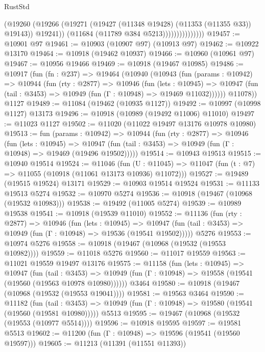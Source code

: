 \begin{lexlean}{RustStd}
\begin{coremodule}
{{{{{{{{{{{{{{{{{{{                              (@19260
                                (@19266
                                  (@19271 (@19427 (@11348 @19428) (@11353 (@11355 @33)) @19143))
                                  @19241))
                              (@11684 (@11789 @384 @5213)))))))))))))))
@19457 := @10901 @97
@19461 := @10903 (@10907 @97) (@10913 @97)
@19462 := @10922 @13170
@19464 := @10918 (@19462 @10937)
@19466 := @10960 (@10961 @97)
@19467 := @10956 @19466
@19469 := @10918 (@19467 @10985)
@19486 := @10917
    (fun (fn : @237) =>
    @19464
      (@10940
        (@10943
          (fun (params : @10942) =>
          @10944
            (fun (rty : @2877) =>
            @10946
              (fun (lets : @10945) =>
              @10947 (fun (tail : @3453) => @10949 (fun (Γ : @10948) => @19469 @11032))))))
        @11078))
    @1127
@19489 := @11084 (@19462 (@10935 @1127))
@19492 := @10997 (@10998 @1127) @13173
@19496 := @10918 (@10989 (@19492 @11006) @11010)
@19497 := @11023 @1127
@19502 := @11020 (@11022 @19497 @13176 @10978 @10980)
@19513 := fun (params : @10942) =>
  @10944
    (fun (rty : @2877) =>
    @10946
      (fun (lets : @10945) =>
      @10947 (fun (tail : @3453) => @10949 (fun (Γ : @10948) => @19469 (@19496 @19502)))))
@19514 := @10943 @19513
@19515 := @10940 @19514
@19524 := @11046
    (fun (U : @11045) => @11047 (fun (t : @7) => @11055 (@10918 (@11061 @13173 @10936) @11072)))
@19527 := @19489 (@19515 @19524) @13171
@19529 := @10903 @19514 @19524
@19531 := @11133 @19513 @5274
@19532 := @10970 @5274
@19536 := @10918 (@19467 (@10968 (@19532 @10983)))
@19538 := @19492 (@11005 @5274)
@19539 := @10989 @19538
@19541 := @10918 (@19539 @11010)
@19552 := @11136
    (fun (rty : @2877) =>
    @10946
      (fun (lets : @10945) =>
      @10947 (fun (tail : @3453) => @10949 (fun (Γ : @10948) => @19536 (@19541 @19502)))))
    @5276
@19553 := @10974 @5276
@19558 := @10918 (@19467 (@10968 (@19532 (@19553 @10982))))
@19559 := @11018 @5276
@19560 := @11017 @19559
@19563 := @11021 @19559 @19497 @13176
@19575 := @11158
    (fun (lets : @10945) =>
    @10947
      (fun (tail : @3453) =>
      @10949 (fun (Γ : @10948) => @19558 (@19541 (@19560 (@19563 @10978 @10980))))))
    @3464
@19580 := @10918 (@19467 (@10968 (@19532 (@19553 @19041))))
@19581 := @19563 @3464
@19590 := @11182
    (fun (tail : @3453) => @10949 (fun (Γ : @10948) => @19580 (@19541 (@19560 (@19581 @10980)))))
    @5513
@19595 := @19467 (@10968 (@19532 (@19553 (@10977 @5514))))
@19596 := @10918 @19595
@19597 := @19581 @5513
@19602 := @11200 (fun (Γ : @10948) => @19596 (@19541 (@19560 @19597)))
@19605 := @11213 (@11391 (@11551 @11393))
}}}}}}}}}}}}}}}}}}}
\end{coremodule}
\end{lexlean}
